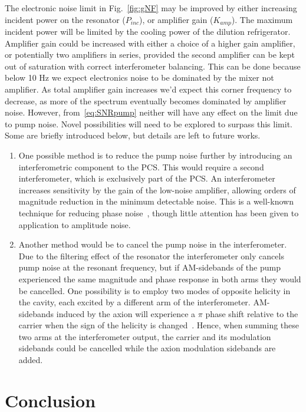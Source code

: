 \documentclass[
  aps,
  physrev,
  reprint,
  superscriptaddress,
  nofootinbib,
  amsmath,
  amssymb
]{revtex4-2}
\begin{document}
The electronic noise limit in Fig.~\ref{fig:gNF} may be improved by either increasing incident power on the resonator ($P_{inc}$), or amplifier gain ($K_{amp}$). The maximum incident power will be limited by the cooling power of the dilution refrigerator. Amplifier gain could be increased with either a choice of a higher gain amplifier, or potentially two amplifiers in series, provided the second amplifier can be kept out of saturation with correct interferometer balancing. This can be done because below 10 Hz we expect electronics noise to be dominated by the mixer not amplifier. As total amplifier gain increases we'd expect this corner frequency to decrease, as more of the spectrum eventually becomes dominated by amplifier noise. However, from~\eqref{eq:SNRpump} neither will have any effect on the limit due to pump noise. Novel possibilities will need to be explored to surpass this limit. Some are briefly introduced below, but details are left to future works.
\begin{enumerate}
    \item One possible method is to reduce the pump noise further by introducing an interferometric component to the PCS. This would require a second interferometer, which is exclusively part of the PCS. An interferometer increases sensitivity by the gain of the low-noise amplifier, allowing orders of magnitude reduction in the minimum detectable noise. This is a well-known technique for reducing phase noise~\cite{ivanov_microwave_1998}, though little attention has been given to application to amplitude noise. 
    \item Another method would be to cancel the pump noise in the interferometer. Due to the filtering effect of the resonator the interferometer only cancels pump noise at the resonant frequency, but if AM-sidebands of the pump experienced the same magnitude and phase response in both arms they would be cancelled. One possibility is to employ two modes of opposite helicity in the cavity, each excited by a different arm of the interferometer. AM-sidebands induced by the axion will experience a $\pi$ phase shift relative to the carrier when the sign of the helicity is changed~\cite{goryachev_axion_2019}. Hence, when summing these two arms at the interferometer output, the carrier and its modulation sidebands could be cancelled while the axion modulation sidebands are added. 
\end{enumerate}

\section{Conclusion}
\end{document}
